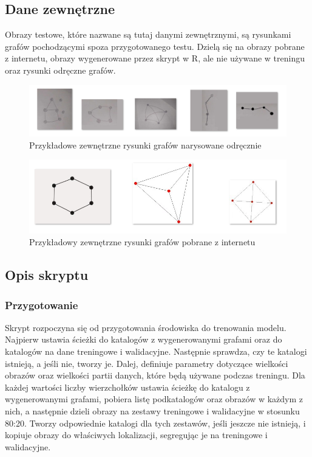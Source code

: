 \subsection{Dane zewnętrzne}
Obrazy testowe, które nazwane są tutaj danymi zewnętrznymi, są rysunkami grafów pochodzącymi spoza przygotowanego testu.
Dzielą się na obrazy pobrane z internetu, obrazy wygenerowane przez skrypt w R, ale nie używane w treningu
oraz rysunki odręczne grafów.

\begin{figure}[ht]
	\centering
	\includegraphics[width=15.5cm]{partials/images/graphs_tests-drawn.png}
	\caption{Przykładowe zewnętrzne rysunki grafów narysowane odręcznie}
	\label{Fig:tests-outside-1}
\end{figure}
\FloatBarrier

\begin{figure}[ht]
	\centering
	\includegraphics[width=15cm]{partials/images/graphs_tests-internet.png}
	\caption{Przykładowy zewnętrzne rysunki grafów pobrane z internetu}
	\label{Fig:tests-outside-2}
\end{figure}
\FloatBarrier

\subsection{Opis skryptu}

\subsubsection{Przygotowanie}
Skrypt rozpoczyna się od przygotowania środowiska do trenowania modelu.
Najpierw ustawia ścieżki do katalogów z wygenerowanymi grafami oraz do katalogów na dane treningowe i walidacyjne.
Następnie sprawdza, czy te katalogi istnieją, a jeśli nie, tworzy je.
Dalej, definiuje parametry dotyczące wielkości obrazów oraz wielkości partii danych, które będą używane podczas treningu.
Dla każdej wartości liczby wierzchołków ustawia ścieżkę do katalogu z wygenerowanymi grafami,
pobiera listę podkatalogów oraz obrazów w każdym z nich,
a następnie dzieli obrazy na zestawy treningowe i walidacyjne w stosunku 80:20.
Tworzy odpowiednie katalogi dla tych zestawów, jeśli jeszcze nie istnieją,
i kopiuje obrazy do właściwych lokalizacji, segregując je na treningowe i walidacyjne.

